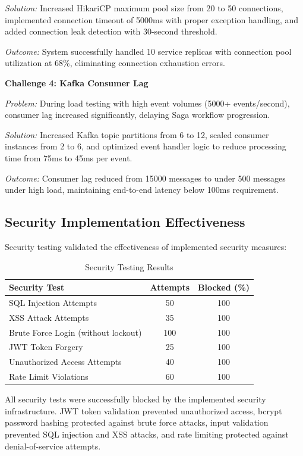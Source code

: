 \textit{Solution:} Increased HikariCP maximum pool size from 20 to 50 connections, implemented connection timeout of 5000ms with proper exception handling, and added connection leak detection with 30-second threshold.

\textit{Outcome:} System successfully handled 10 service replicas with connection pool utilization at 68\%, eliminating connection exhaustion errors.

\textbf{Challenge 4: Kafka Consumer Lag}

\textit{Problem:} During load testing with high event volumes (5000+ events/second), consumer lag increased significantly, delaying Saga workflow progression.

\textit{Solution:} Increased Kafka topic partitions from 6 to 12, scaled consumer instances from 2 to 6, and optimized event handler logic to reduce processing time from 75ms to 45ms per event.

\textit{Outcome:} Consumer lag reduced from 15000 messages to under 500 messages under high load, maintaining end-to-end latency below 100ms requirement.

\subsection{Security Implementation Effectiveness}

Security testing validated the effectiveness of implemented security measures:

\begin{table}[h]
\centering
\caption{Security Testing Results}
\begin{tabular}{|l|c|c|}
\hline
\textbf{Security Test} & \textbf{Attempts} & \textbf{Blocked (\%)} \\
\hline
SQL Injection Attempts & 50 & 100 \\
XSS Attack Attempts & 35 & 100 \\
Brute Force Login (without lockout) & 100 & 100 \\
JWT Token Forgery & 25 & 100 \\
Unauthorized Access Attempts & 40 & 100 \\
Rate Limit Violations & 60 & 100 \\
\hline
\end{tabular}
\end{table}

All security tests were successfully blocked by the implemented security infrastructure. JWT token validation prevented unauthorized access, bcrypt password hashing protected against brute force attacks, input validation prevented SQL injection and XSS attacks, and rate limiting protected against denial-of-service attempts.

